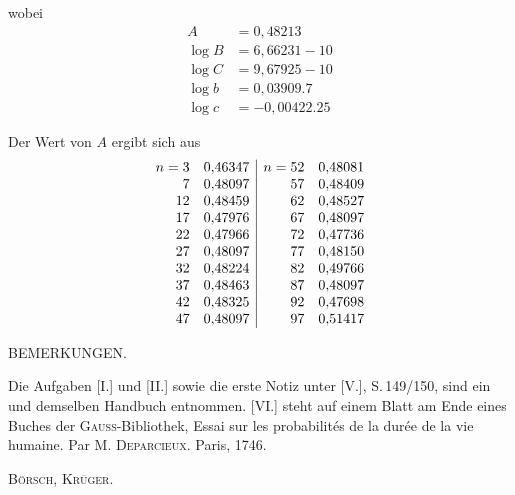 wobei
\[
\begin{array}{rl}
A &= 0{,}48213\\
\log B &= 6{,}66231 - 10\\
\log C &= 9{,}67925 - 10\\
\log b &= 0{,}03909.7 \\
\log c &= -0{,}00422.25
\end{array}
\]


Der Wert von $A$ ergibt sich aus
\[
\begin{array}{r@{\quad}l|r@{\quad}l}
n=3 & 0{,}46347 & n=52 & 0{,}48081\\
7 & 0{,}48097 & 57 & 0{,}48409\\
12 & 0{,}48459 & 62 & 0{,}48527\\
17 & 0{,}47976 & 67 & 0{,}48097\\
22 & 0{,}47966 & 72 & 0{,}47736\\
27 & 0{,}48097 & 77 & 0{,}48150\\
32 & 0{,}48224 & 82 & 0{,}49766\\
37 & 0{,}48463 & 87 & 0{,}48097\\
42 & 0{,}48325 & 92 & 0{,}47698\\
47 & 0{,}48097 & 97 & 0{,}51417
\end{array}
\]

\begin{center}
BEMERKUNGEN.
\end{center}

Die Aufgaben [I.] und [II.] sowie die erste Notiz unter [V.], S.\,149/150, sind ein und demselben Handbuch entnommen. [VI.] steht auf einem Blatt am Ende eines Buches der \textsc{Gauss}-Bibliothek, Essai sur les probabilités de la durée de la vie humaine. Par M. \textsc{Deparcieux}. Paris, 1746.

\hfill \textsc{Börsch}, \textsc{Krüger}.
